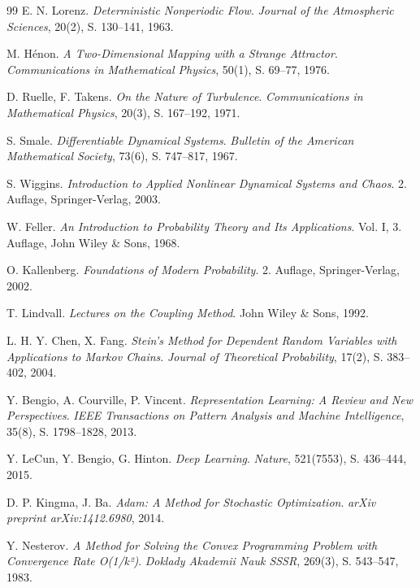 \documentclass[a4paper,12pt]{article}
\theoremstyle{definition}
\begin{document}
\begin{thebibliography}{99}
 E. N. Lorenz. \textit{Deterministic Nonperiodic Flow}. \textit{Journal of the Atmospheric Sciences}, 20(2), S. 130--141, 1963.

 M. Hénon. \textit{A Two-Dimensional Mapping with a Strange Attractor}. \textit{Communications in Mathematical Physics}, 50(1), S. 69--77, 1976.

 D. Ruelle, F. Takens. \textit{On the Nature of Turbulence}. \textit{Communications in Mathematical Physics}, 20(3), S. 167--192, 1971.

 S. Smale. \textit{Differentiable Dynamical Systems}. \textit{Bulletin of the American Mathematical Society}, 73(6), S. 747--817, 1967.

 S. Wiggins. \textit{Introduction to Applied Nonlinear Dynamical Systems and Chaos}. 2. Auflage, Springer-Verlag, 2003.


 W. Feller. \textit{An Introduction to Probability Theory and Its Applications}. Vol. I, 3. Auflage, John Wiley \& Sons, 1968.

 O. Kallenberg. \textit{Foundations of Modern Probability}. 2. Auflage, Springer-Verlag, 2002.

 T. Lindvall. \textit{Lectures on the Coupling Method}. John Wiley \& Sons, 1992.

 L. H. Y. Chen, X. Fang. \textit{Stein's Method for Dependent Random Variables with Applications to Markov Chains}. \textit{Journal of Theoretical Probability}, 17(2), S. 383--402, 2004.


 Y. Bengio, A. Courville, P. Vincent. \textit{Representation Learning: A Review and New Perspectives}. \textit{IEEE Transactions on Pattern Analysis and Machine Intelligence}, 35(8), S. 1798--1828, 2013.

 Y. LeCun, Y. Bengio, G. Hinton. \textit{Deep Learning}. \textit{Nature}, 521(7553), S. 436--444, 2015.

 D. P. Kingma, J. Ba. \textit{Adam: A Method for Stochastic Optimization}. \textit{arXiv preprint arXiv:1412.6980}, 2014.

 Y. Nesterov. \textit{A Method for Solving the Convex Programming Problem with Convergence Rate O(1/k²)}. \textit{Doklady Akademii Nauk SSSR}, 269(3), S. 543--547, 1983.


\end{thebibliography}
\end{document}
